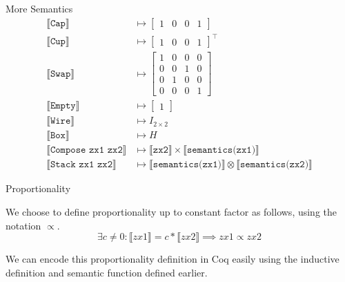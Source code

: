 \documentclass{beamer}
\begin{document}
\begin{frame}{More Semantics}
    \begin{align*}
        \llbracket\texttt{Cap}\rrbracket &\mapsto 
        \begin{bmatrix} 
            1 & 0 & 0 & 1
        \end{bmatrix}
    \\
        \llbracket\texttt{Cup}\rrbracket &\mapsto 
        \begin{bmatrix} 
            1 & 0 & 0 & 1
        \end{bmatrix}^\top
    \\
        \llbracket\texttt{Swap}\rrbracket &\mapsto
        \begin{bmatrix}
            1 & 0 & 0 & 0 \\
            0 & 0 & 1 & 0 \\
            0 & 1 & 0 & 0 \\
            0 & 0 & 0 & 1
        \end{bmatrix}
    \\
        \llbracket\texttt{Empty}\rrbracket &\mapsto
        \begin{bmatrix}
            1
        \end{bmatrix}
    \\   
        \llbracket\texttt{Wire}\rrbracket &\mapsto I_{2\times 2}
    \\
        \llbracket\texttt{Box}\rrbracket &\mapsto H
    \\
        \llbracket\texttt{Compose zx1 zx2}\rrbracket &\mapsto 
        \llbracket\texttt{zx2}\rrbracket \times \llbracket\texttt{semantics(zx1)}\rrbracket
    \\
        \llbracket\texttt{Stack zx1 zx2}\rrbracket &\mapsto
        \llbracket\texttt{semantics(zx1)}\rrbracket \otimes \llbracket\texttt{semantics(zx2)}\rrbracket
    \end{align*}
\end{frame}

\begin{frame}{Proportionality}

  We choose to define proportionality up to constant factor as follows, using the notation $\propto$.
  \[
      \exists c \neq 0: \llbracket zx1 \rrbracket = c * \llbracket zx2 \rrbracket \implies zx1 \propto zx2
  \]
  
  We can encode this proportionality definition in Coq easily using the inductive definition and semantic function defined earlier.

\end{frame}
\end{document}

